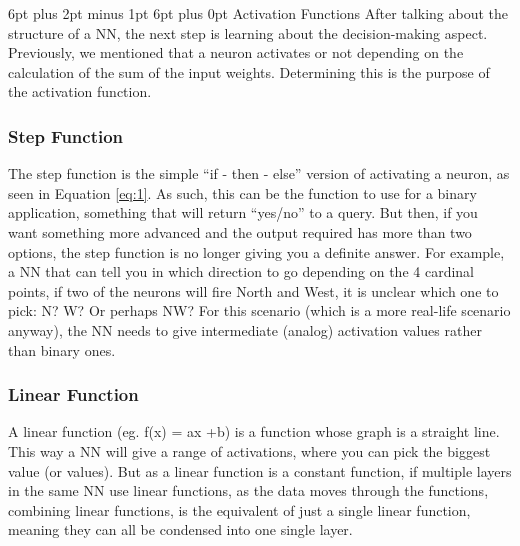 \documentclass[12pt,a4paper]{article}
\makeatletter
\renewcommand\subsection{\@startsection {subsection}{1}{2mm} %
                               {6pt plus 2pt minus 1pt} %
                               {6pt plus 0pt} %
                               {\normalfont\bfseries}}
\makeatother
\begin{document}
\subsection{Activation Functions}
After talking about the structure of a NN, the next step is learning about the decision-making aspect. Previously, we mentioned that a neuron activates or not depending on the calculation of the sum of the input weights. Determining this is the purpose of the activation function.\par
\subsubsection{Step Function}
The step function is the simple “if - then - else” version of activating a neuron, as seen in Equation \ref{eq:1}. As such, this can be the function to use for a binary application,  something that will return “yes/no” to a query. But then, if you want something more advanced and the output required has more than two options, the step function is no longer giving you a definite answer. For example, a NN that can tell you in which direction to go depending on the 4 cardinal points, if two of the neurons will fire North and West, it is unclear which one to pick: N? W? Or perhaps NW? For this scenario (which is a more real-life scenario anyway), the NN needs to give intermediate (analog) activation values rather than binary ones. \cite{sharma_understanding_2017}
\subsubsection{Linear Function}
A linear function (eg. f(x) = ax +b) is a function whose graph is a straight line. This way a NN will give a range of activations, where you can pick the biggest value (or values). But as a linear function is a constant function, if multiple layers in the same NN use linear functions, as the data moves through the functions, combining linear functions, is the equivalent of just a single linear function, meaning they can all be condensed into one single layer.
\end{document}
